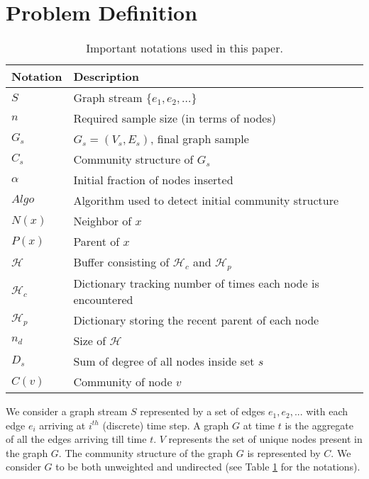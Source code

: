 \section{Problem Definition}
\label{prob_def}

\begin{table}[!t]
\centering
\caption{\label{notation}Important notations used in this paper.}
\begin{tabular}{l | l}
\hline
{\bf Notation} & {\bf Description} \\\hline
$S$ & Graph stream $\{e_1,e_2,
\dots\}$ \\
$n$ & Required sample size (in terms of nodes)\\
$G_s$ & $G_s=(V_s,E_s)$, final graph sample\\ 
$C_s$ & Community structure of $G_s$\\
$\alpha$ & Initial fraction of nodes inserted\\
$Algo$ & Algorithm used to detect initial community structure\\
$N(x)$ & Neighbor of $x$\\
$P(x)$ & Parent of $x$\\
$\mathcal{H}$ & Buffer consisting of $\mathcal{H}_c$ and $\mathcal{H}_p$ \\ 
$\mathcal{H}_c$ & Dictionary tracking number of times each node is encountered\\
$\mathcal{H}_p$ & Dictionary storing the recent parent of each node\\
$n_d$ & Size of $\mathcal{H}$ \\
$D_s$ & Sum of degree of all nodes inside set $s$ \\
$C(v)$ & Community of node $v$\\\hline

\end{tabular}
\end{table}



We consider a graph stream $S$ represented by a set of edges $e_1, e_2,...$ with each edge $e_i$ arriving at 
$i^{th}$ (discrete) time step. A graph $G$ at time $t$ is the aggregate of all the edges arriving till time $t$. 
$V$ represents the set of unique nodes present in the graph $G$. The community structure of the graph $G$ is represented by $C$. We consider $G$ to be both unweighted and undirected (see Table \ref{notation} for the notations).

